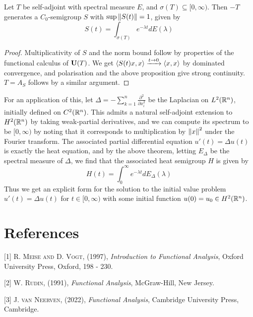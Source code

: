 \documentclass[10pt]{amsart}
\begin{document}
\begin{theorem}
    Let $T$ be self-adjoint with spectral measure $E$, and $\sigma(T) \subseteq [0, \infty)$. Then $-T$ generates a $C_0$-semigroup $S$ with $\sup\left\| S(t) \right\| = 1$, given by
    $$
        S(t) = \int_{\sigma(T)} e^{-\lambda t} dE(\lambda)
    $$
\end{theorem}
\begin{proof}
    Multiplicativity of $S$ and the norm bound follow by properties of the functional calculus of $\mathbf{U}(T)$. We get $\left\langle S(t)x, x \right\rangle \xrightarrow{t \to 0} \left\langle x, x \right\rangle$ by dominated convergence, and polarisation and the above proposition give strong continuity. $T = A_S$ follows by a similar argument.
\end{proof}
For an application of this, let $\Delta = -\sum_{k = 1}^n \frac{\partial^2}{\partial x_i^2}$ be the Laplacian on $L^2(\mathbb{R}^n)$, initially defined on $C^2(\mathbb{R}^n)$. This admits a natural self-adjoint extension to $H^2(\mathbb{R}^n)$ by taking weak-partial derivatives, and we can compute its spectrum to be $[0, \infty)$ by noting that it corresponds to multiplication by $\left\| x \right\|^2$ under the Fourier transform. The associated partial differential equation $u'(t) = \Delta u(t)$ is exactly the heat equation, and by the above theorem, letting $E_\Delta$ be the spectral measure of $\Delta$, we find that the associated heat semigroup $H$ is given by
$$
    H(t) = \int_0^\infty e^{-\lambda t}dE_\Delta(\lambda)
$$
Thus we get an explicit form for the solution to the initial value problem $u'(t) = \Delta u(t)$ for $t \in [0, \infty)$ with some initial function $u(0) = u_0 \in H^2(\mathbb{R}^n)$.








\section{References}



[1] \hypertarget{meisevogt}{\textsc{R. Meise and D. Vogt}, (1997), \emph{Introduction to Functional Analysis}, Oxford University Press, Oxford, 198 - 230.}

[2] \hypertarget{rudin}{\textsc{W. Rudin}, (1991), \emph{Functional Analysis}, McGraw-Hill, New Jersey.}

[3] \hypertarget{jvn}{\textsc{J. van Neerven}, (2022), \emph{Functional Analysis}, Cambridge University Press, Cambridge.}

\end{document}
